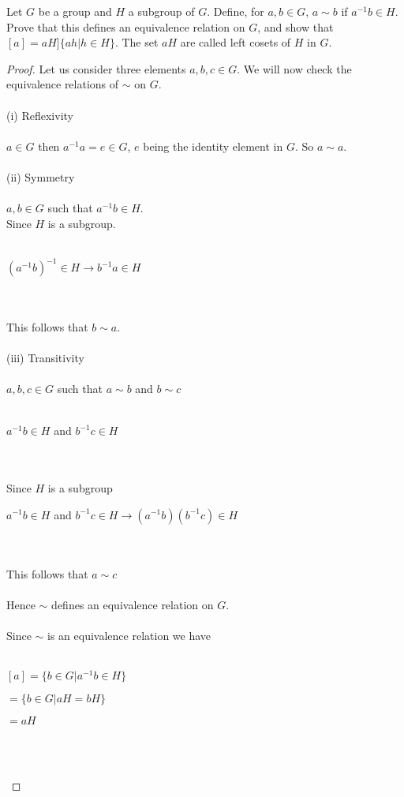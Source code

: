 \documentclass[12pt]{article}
\newenvironment{problem}[2][Problem]{\begin{trivlist}
\item[\hskip \labelsep {\bfseries #1}\hskip \labelsep {\bfseries #2.}]}{\end{trivlist}}
\begin{document}
\begin{problem}{2.4.5}
Let $G$ be a group and $H$ a subgroup of $G$. Define, for $a,b \in G$, $a\sim b$ if $a^{-1}b \in H$. Prove that this defines an equivalence relation on $G$, and show that $[a] = aH ] \{ah | h\in H\}$. The set $aH$ are called left cosets of $H$ in $G$.
\end{problem}

\begin{proof}
Let us consider three elements $a,b,c \in G$. We will now check the equivalence relations of $\sim$ on $G$. \\ \\
(i) Reflexivity \\ \\
$a \in G$ then $a^{-1}a=e \in G$, $e$ being the identity element in $G$. So $a \sim a$. \\ \\
(ii) Symmetry \\ \\
$a,b \in G$ such that $a^{-1}b \in H$. \\
Since $H$ is a subgroup. \\ \\
\centerline{$(a^{-1}b)^{-1} \in H \rightarrow b^{-1}a \in H$} \\ \\
This follows that $b \sim a$. \\ \\
(iii) Transitivity \\ \\
$a,b,c \in G$ such that $a \sim b$ and $b \sim c$ \\ \\
\centerline{$a^{-1}b \in H$ and $b^{-1}c \in H$} \\ \\ 
Since $H$ is a subgroup \\ 
\centerline{$a^{-1}b \in H$ and $b^{-1}c \in H \rightarrow (a^{-1}b)(b^{-1}c) \in H$} \\ \\
This follows that $a \sim c$ \\ \\
Hence $\sim$ defines an equivalence relation on $G$. \\ \\
Since $\sim$ is an equivalence relation we have \\ \\
\centerline{$[a] = \{b \in G | a^{-1}b \in H \}$}
\centerline{$= \{b \in G | aH = bH \}$}
\centerline{$=aH$} \\ \\
\centerline{\fbox{Hence, $\sim$ defines an equivalence relation on $G$ and $[a] = aH ] \{ah | h\in H\}$}}
\end{proof}
 
\end{document}
